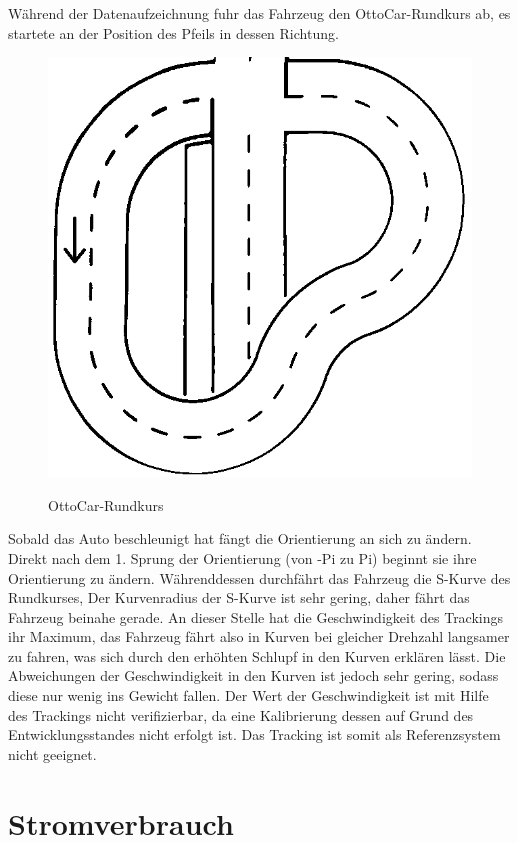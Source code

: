 Während der Datenaufzeichnung fuhr das Fahrzeug den OttoCar-Rundkurs ab, es startete  an der Position des Pfeils in dessen Richtung.


\begin{figure}[H]
\centering
\includegraphics[width=.8\textwidth]{Strasse_mono.png}\\
\caption{OttoCar-Rundkurs}%
\label{fig:strasse}
\end{figure}

Sobald das Auto beschleunigt hat fängt die Orientierung an sich zu ändern. Direkt nach dem 1. Sprung der Orientierung (von -Pi zu Pi)
 beginnt sie ihre Orientierung zu ändern. Währenddessen durchfährt das Fahrzeug die S-Kurve des Rundkurses, Der Kurvenradius der S-Kurve ist sehr gering, daher fährt das Fahrzeug
 beinahe gerade. An dieser Stelle hat die Geschwindigkeit des Trackings ihr Maximum, das Fahrzeug fährt also in  Kurven bei gleicher Drehzahl langsamer zu fahren, was sich durch
 den erhöhten Schlupf in den Kurven erklären lässt. Die Abweichungen der Geschwindigkeit in den Kurven ist jedoch sehr gering, sodass diese nur wenig ins Gewicht fallen.
 Der Wert der Geschwindigkeit ist mit Hilfe des Trackings nicht verifizierbar, da eine Kalibrierung dessen auf Grund des Entwicklungsstandes nicht erfolgt ist.
 Das Tracking ist somit als Referenzsystem nicht geeignet.
 
 
\section{Stromverbrauch}


